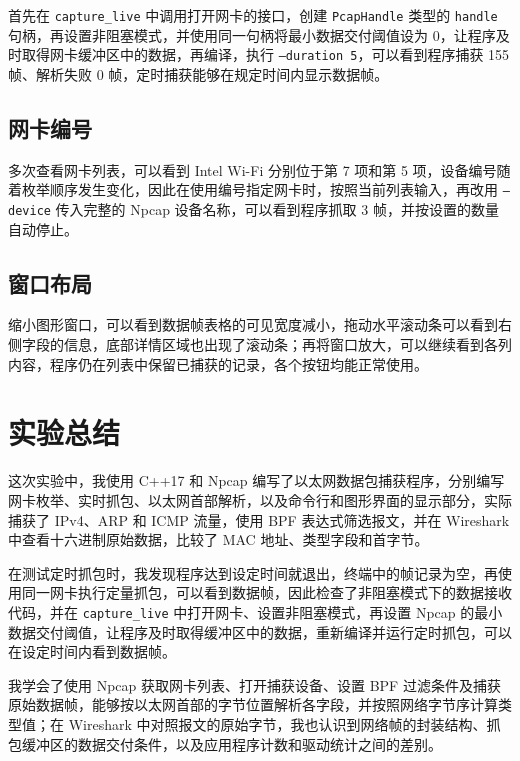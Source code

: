 \documentclass[UTF8,a4paper,11pt,scheme=chinese]{ctexart}
\newcommand{\code}[1]{\texttt{#1}}
\begin{document}
首先在 \code{capture\_live} 中调用打开网卡的接口，创建 \code{PcapHandle} 类型的 \code{handle} 句柄，再设置非阻塞模式，并使用同一句柄将最小数据交付阈值设为 0，让程序及时取得网卡缓冲区中的数据，再编译，执行 \code{--duration 5}，可以看到程序捕获 155 帧、解析失败 0 帧，定时捕获能够在规定时间内显示数据帧。

\subsection{网卡编号}
多次查看网卡列表，可以看到 Intel Wi-Fi 分别位于第 7 项和第 5 项，设备编号随着枚举顺序发生变化，因此在使用编号指定网卡时，按照当前列表输入，再改用 \code{--device} 传入完整的 Npcap 设备名称，可以看到程序抓取 3 帧，并按设置的数量自动停止。

\subsection{窗口布局}
缩小图形窗口，可以看到数据帧表格的可见宽度减小，拖动水平滚动条可以看到右侧字段的信息，底部详情区域也出现了滚动条；再将窗口放大，可以继续看到各列内容，程序仍在列表中保留已捕获的记录，各个按钮均能正常使用。

\section{实验总结}
这次实验中，我使用 C++17 和 Npcap 编写了以太网数据包捕获程序，分别编写网卡枚举、实时抓包、以太网首部解析，以及命令行和图形界面的显示部分，实际捕获了 IPv4、ARP 和 ICMP 流量，使用 BPF 表达式筛选报文，并在 Wireshark 中查看十六进制原始数据，比较了 MAC 地址、类型字段和首字节。

在测试定时抓包时，我发现程序达到设定时间就退出，终端中的帧记录为空，再使用同一网卡执行定量抓包，可以看到数据帧，因此检查了非阻塞模式下的数据接收代码，并在 \code{capture\_live} 中打开网卡、设置非阻塞模式，再设置 Npcap 的最小数据交付阈值，让程序及时取得缓冲区中的数据，重新编译并运行定时抓包，可以在设定时间内看到数据帧。

我学会了使用 Npcap 获取网卡列表、打开捕获设备、设置 BPF 过滤条件及捕获原始数据帧，能够按以太网首部的字节位置解析各字段，并按照网络字节序计算类型值；在 Wireshark 中对照报文的原始字节，我也认识到网络帧的封装结构、抓包缓冲区的数据交付条件，以及应用程序计数和驱动统计之间的差别。
\end{document}
